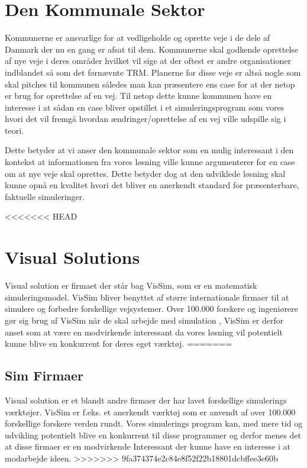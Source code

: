 \section {Den Kommunale Sektor}
Kommunerne er ansvarlige for at vedligeholde og oprette veje i de dele af Danmark der nu en gang er afsat til dem. Kommunerne skal godkende oprettelse af nye veje i deres områder hvilket vil sige at der oftest er andre organisationer indblandet så som det førnævnte TRM. Planerne for disse veje er altså nogle som skal pitches til kommunen således man kan præsentere ens case for at der netop er brug for oprettelse af en vej. Til netop dette kunne kommunen have en interesse i at sådan en case bliver opstillet i et simuleringsprogram som vores hvori det vil fremgå hvordan ændringer/oprettelse af en vej ville udspille sig i teori.

\vspace{5mm}

Dette betyder at vi anser den kommunale sektor som en mulig interessant i den kontekst at informationen fra vores løsning ville kunne argumenterer for en case om at nye veje skal oprettes. Dette betyder dog at den udviklede løsning skal kunne opnå en kvalitet hvori det bliver en anerkendt standard for præsenterbare, faktuelle simuleringer.

<<<<<<< HEAD
\section{Visual Solutions}
Visual solution er firmaet der står bag VisSim, som er en matematisk simuleringsmodel. VisSim bliver benyttet af større internationale firmaer til at simulere og forbedre forskellige vejsystemer. Over 100.000 forskere og ingeniørere gør sig brug af VisSim når de skal arbejde med simulation\cite{VisualSolutions}
, VisSim er derfor anset som at være en modvirkende interessant da vores løsning vil potentielt kunne blive en konkurrent for deres eget værktøj.
=======
\subsection{Sim Firmaer}
Visual solution er et blandt andre firmaer der har lavet forskellige simulerings værktøjer. VisSim er f.eks. et anerkendt værktøj som er anvendt af over 100.000 forskellige forskere verden rundt\cite{VisualSolutions}.
Vores simulerings program kan, med mere tid og udvikling potentielt blive en konkurrent til disse programmer og derfor menes det at disse firmaer er en modvirkende Interessant der kunne have en interesse i at modarbejde ideen.
>>>>>>> 9fa374374e2c84e8f52f22b18801dcbffee3e60b

